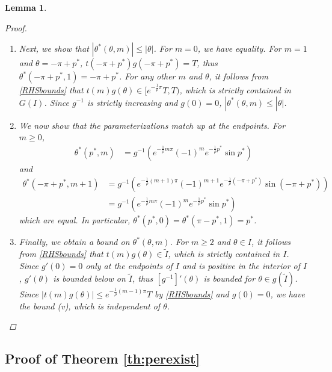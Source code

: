 \documentclass[10pt,reqno]{amsart}
\theoremstyle{plain}
\newtheorem{lemma}[theorem]{Lemma}
\theoremstyle{definition}
\theoremstyle{remark}
\numberwithin{theorem}{section}
\numberwithin{equation}{section}
\begin{document}
\begin{lemma}
\begin{proof}
\begin{enumerate}
\item Next, we show that $|\theta^*(\theta, m)| \leq |\theta|$. For $m = 0$, we have equality. For $m = 1$ and $\theta = -\pi + p^*$, $t(-\pi + p^*)g(-\pi + p^*) = T$, thus $\theta^*(-\pi + p^*, 1) = -\pi + p^*$. For any other $m$ and $\theta$, it follows from \cref{RHSbounds} that $t(m)g(\theta) \in [e^{-\frac{1}{\rho}\pi}T, T)$, which is strictly contained in $G(I)$. Since $g^{-1}$ is strictly increasing and $g(0) = 0$, $|\theta^*(\theta, m) \leq |\theta|$.

\item We now show that the parameterizations match up at the endpoints. For $m \geq 0$, 
\begin{align*}
\theta^*(p^*, m) &= g^{-1}\left( e^{-\frac{1}{\rho}m \pi} (-1)^m e^{-\frac{1}{\rho}p^*} \sin p^* \right)
\end{align*}
and
\begin{align*}
\theta^*(-\pi + p^*, m+1) &= g^{-1}\left( e^{-\frac{1}{\rho}(m+1) \pi} (-1)^{m+1} e^{-\frac{1}{\rho}(-\pi + p^*)} \sin (-\pi + p^*) \right) \\
&=g^{-1}\left( e^{-\frac{1}{\rho}m \pi} (-1)^m e^{-\frac{1}{\rho}p^*} \sin p^* \right)
\end{align*}
which are equal. In particular, $\theta^*(p^*, 0) = \theta^*(\pi - p^*, 1) = p^*$.

\item Finally, we obtain a bound on $\theta^*(\theta, m)$. For $m \geq 2$ and $\theta \in I$, it follows from \cref{RHSbounds} that $t(m)g(\theta) \in \tilde{I}$, which is strictly contained in $I$. Since $g'(0) = 0$ only at the endpoints of $I$ and is positive in the interior of $I$, $g'(\theta)$ is bounded below on $\tilde{I}$, thus $[g^{-1}]'(\theta)$ is bounded for $\theta \in g(\tilde{I})$. Since $|t(m)g(\theta)| \leq e^{-\frac{1}{\rho}(m - 1)\pi}T$ by \cref{RHSbounds} and $g(0) = 0$, we have the bound (v), which is independent of $\theta$.
\end{enumerate}
\end{proof}
\end{lemma}

\subsection{Proof of Theorem \ref{th:perexist}}
\end{document}

